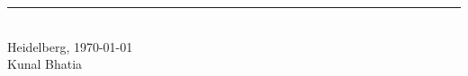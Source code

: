 \documentclass[
     12pt,         %
     a4paper,      %
     BCOR=10mm,    %
     DIV=14,       %
     twoside,      %
     openright,    %
     listof=totoc, %
     bibliography=totoc, %
     ]{scrreprt}
\begin{document}
\vspace{3cm}

\noindent
\rule{6cm}{0.4pt}\\
Heidelberg, \today\\
Kunal Bhatia

\cleardoublepage



\cleardoublepage


\tableofcontents
\cleardoublepage

\listoffigures
\cleardoublepage

\listoftables
\cleardoublepage












\cleardoublepage
{}
{}



\cleardoublepage
\appendix



\end{document}
